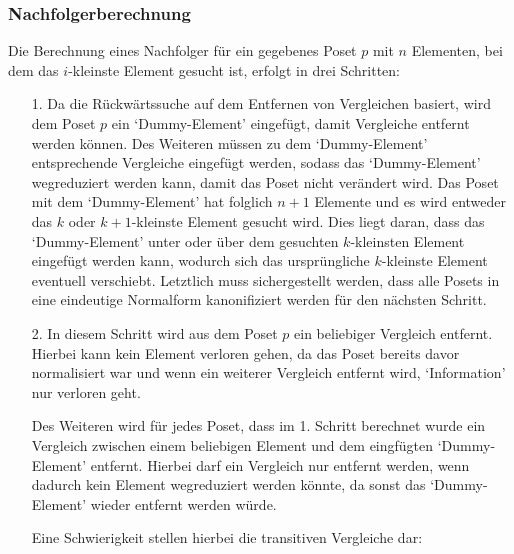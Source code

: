 \documentclass[10pt,journal,compsoc]{IEEEtran}
\begin{document}
\subsubsection{Nachfolgerberechnung}
Die Berechnung eines Nachfolger für ein gegebenes Poset $p$ mit $n$ Elementen, bei dem das $i$-kleinste Element gesucht ist, erfolgt in drei Schritten:
\begin{itemize}
  \item[1.]
    Da die Rückwärtssuche auf dem Entfernen von Vergleichen basiert, wird dem Poset $p$ ein `Dummy-Element' eingefügt, damit Vergleiche entfernt werden können.
    Des Weiteren müssen zu dem `Dummy-Element' entsprechende Vergleiche eingefügt werden, sodass das `Dummy-Element' wegreduziert werden kann, damit das Poset nicht verändert wird.
    Das Poset mit dem `Dummy-Element' hat folglich $n + 1$ Elemente und es wird entweder das $k$ oder $k + 1$-kleinste Element gesucht wird.
    Dies liegt daran, dass das `Dummy-Element' unter oder über dem gesuchten $k$-kleinsten Element eingefügt werden kann, wodurch sich das ursprüngliche $k$-kleinste Element eventuell verschiebt.
    Letztlich muss sichergestellt werden, dass alle Posets in eine eindeutige Normalform kanonifiziert werden für den nächsten Schritt.

  \item[2.]
    In diesem Schritt wird aus dem Poset $p$ ein beliebiger Vergleich entfernt.
    Hierbei kann kein Element verloren gehen, da das Poset bereits davor normalisiert war und wenn ein weiterer Vergleich entfernt wird, `Information' nur verloren geht. %

    Des Weiteren wird für jedes Poset, dass im 1. Schritt berechnet wurde ein Vergleich zwischen einem beliebigen Element und dem eingfügten `Dummy-Element' entfernt.
    Hierbei darf ein Vergleich nur entfernt werden, wenn dadurch kein Element wegreduziert werden könnte, da sonst das `Dummy-Element' wieder entfernt werden würde.

    Eine Schwierigkeit stellen hierbei die transitiven Vergleiche dar: \\
    \begin{figure}
\end{figure}
\end{itemize}
\end{document}
